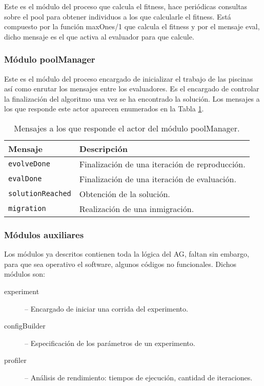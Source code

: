 \documentclass[runningheads]{llncs}
\begin{document}
Este es el módulo del proceso que calcula el fitness, hace periódicas consultas sobre el pool para obtener individuos a los que calcularle el fitness. Está compuesto por la función maxOnes/1 que calcula el fitness y por el mensaje eval, dicho mensaje es el que activa al evaluador para que calcule.

\subsubsection{Módulo poolManager}

Este es el módulo del proceso encargado de inicializar el trabajo de las piscinas así como enrutar los mensajes entre los evaluadores. Es el encargado de controlar la finalización del algoritmo una vez se ha encontrado la solución.  Los mensajes a los que responde este actor aparecen enumerados en la Tabla \ref{tb:poolManager}.

\begin{table}
  \centering
\begin{tabular}{|p{5cm}|p{7cm}|}
  \hline
   \textbf{Mensaje} &  \textbf{Descripción} \\
  \hline
  {\tt evolveDone } & Finalización de una iteración de reproducción. \\
  \hline
  {\tt evalDone} & Finalización de una iteración de evaluación. \\
  \hline
 {\tt solutionReached} & Obtención de la solución. \\
  \hline
  {\tt migration} & Realización de una inmigración. \\
  \hline
\end{tabular}
  \caption{Mensajes a los que responde el actor del módulo poolManager.}\label{tb:poolManager}
\end{table}


\subsubsection{Módulos auxiliares}

Los módulos ya descritos contienen toda la lógica del AG, faltan sin embargo, para que sea operativo el software, algunos códigos no funcionales. Dichos módulos son:

\begin{description}
  
  \item[experiment] -- Encargado de iniciar una corrida del experimento.
  
  \item[configBuilder] -- Especificación de los parámetros de un experimento.
  
  \item[profiler] -- Análisis de rendimiento: tiempos de ejecución, cantidad de iteraciones.
  
\end{description}
\end{document}
